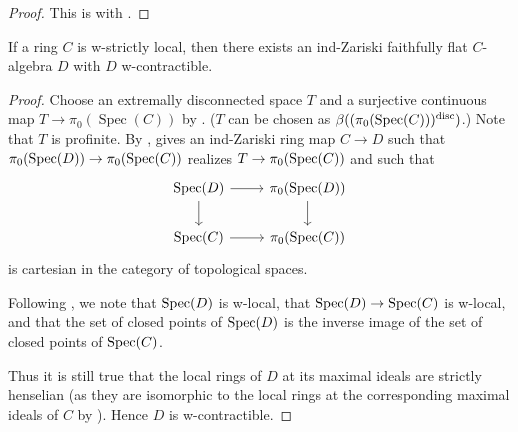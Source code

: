 \begin{proof}
  This is  with .
\end{proof}

\begin{lemma}
  If a ring \(C\) is w-strictly local, then there exists an ind-Zariski faithfully flat \(C\)-algebra \(D\) with \(D\) w-contractible.
  \label{thm:ind-etale-w-contractible-cover-of-w-strictly-local}
  \leanok
\end{lemma}

\begin{proof}
  Choose an extremally disconnected space $T$ and a surjective continuous map $T \to \pi_0(\operatorname{Spec}(C))$ by . (\(T\) can be chosen as \(\beta((\pi_0(\operatorname{Spec}(C)))^{\textnormal{disc}})\).) Note that $T$ is profinite.
  By ,  gives an ind-Zariski ring map
  $C \to D$ such that $\pi_0(\operatorname{Spec} (D)) \to \pi_0(\operatorname{Spec} (C))$ realizes $T \to \pi_0(\operatorname{Spec} (C))$ and such that
  \[
  \begin{tikzcd}
  \operatorname{Spec}(D) \arrow[r] \arrow[d] & \pi_0(\operatorname{Spec}(D)) \arrow[d] \\
  \operatorname{Spec}(C) \arrow[r] & \pi_0(\operatorname{Spec}(C))
  \end{tikzcd}
  \]
  is cartesian in the category of topological spaces.

  Following , we note that $\operatorname{Spec} (D)$ is w-local, that $\operatorname{Spec} (D) \to \operatorname{Spec} (C)$ is w-local, and that the set of closed points of $\operatorname{Spec} (D)$ is the inverse image of the set of closed points of $\operatorname{Spec} (C)$.

  Thus it is still true that the local rings of $D$ at its maximal ideals are strictly henselian (as they are isomorphic to the local rings at the corresponding maximal ideals of $C$ by ). Hence $D$ is w-contractible.
\end{proof}

